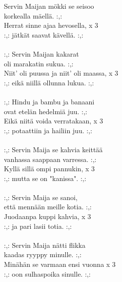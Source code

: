 
Servin Maijan mökki se seisoo  \\ korkealla mäellä. :,: \\ Herrat sinne ajaa hevosella,  x 3 \\ :,: jätkät saavat kävellä. :,:  \\ \hspace{10mm} \\ :,: Servin Maijan kakarat  \\ oli marakatin sukua. :,: \\ Niit' oli puussa ja niit' oli maassa,  x 3 \\ :,: eikä niillä ollunna lukua. :,:  \\ \hspace{10mm} \\ :,: Hindu ja bambu ja banaani  \\ ovat etelän hedelmiä juu. :,: \\ Eikä niitä voida verratakaan,  x 3 \\ :,: potaattiin ja hailiin juu. :,:  \\ \hspace{10mm} \\ :,: Servin Maija se kahvia keittää  \\ vanhassa saappaan varressa. :,: \\ Kyllä sillä ompi pannukin,  x 3 \\ :,: mutta se on "kanissa". :,: \\ \hspace{10mm} \\ :,: Servin Maija se sanoi,  \\ että mennään meille kotia. :,: \\ Juodaanpa kuppi kahvia,  x 3 \\ :,: ja pari lasii totia. :,: \\ \hspace{10mm} \\ :,: Servin Maija nätti flikka  \\ kaadas ryyppy minulle. :,: \\ Minähän se varmaan ensi vuonna  x 3 \\ :,: oon sulhaspoika sinulle. :,: \\